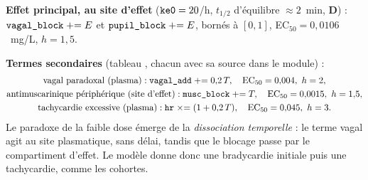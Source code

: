 \documentclass[10pt,a4paper]{article}
\newcommand{\vp}[1]{\text{\texttt{\detokenize{#1}}}}
\newcommand{\evD}{\textcolor{red!70!black}{\textbf{D}}}
\begin{document}
\textbf{Effet principal, au site d'effet} ($\vp{ke0} = 20$/h, $t_{1/2}$ d'équilibre $\approx 2$~min,
\evD{}) : $\vp{vagal_block} \mathrel{+}= E$ et $\vp{pupil_block} \mathrel{+}= E$, bornés à $[0, 1]$,
EC$_{50} = 0{,}0106$~mg/L, $h = 1{,}5$.

\textbf{Termes secondaires} (tableau \vp{toxicity}, chacun avec sa source dans le module) :
\begin{gather}
\text{vagal paradoxal (plasma)} : \vp{vagal_add} \mathrel{+}= 0{,}2\,T,\quad \text{EC}_{50} = 0{,}004,\ h = 2,\\
\text{antimuscarinique périphérique (site d'effet)} : \vp{musc_block} \mathrel{+}= T,\quad \text{EC}_{50} = 0{,}0015,\ h = 1{,}5,\\
\text{tachycardie excessive (plasma)} : \vp{hr} \mathrel{\times}= (1 + 0{,}2\,T),\quad \text{EC}_{50} = 0{,}045,\ h = 3.
\end{gather}
Le paradoxe de la faible dose émerge de la \emph{dissociation temporelle} : le terme vagal agit au
site plasmatique, sans délai, tandis que le blocage passe par le compartiment d'effet. Le modèle
donne donc une bradycardie initiale puis une tachycardie, comme les cohortes.
\end{document}
